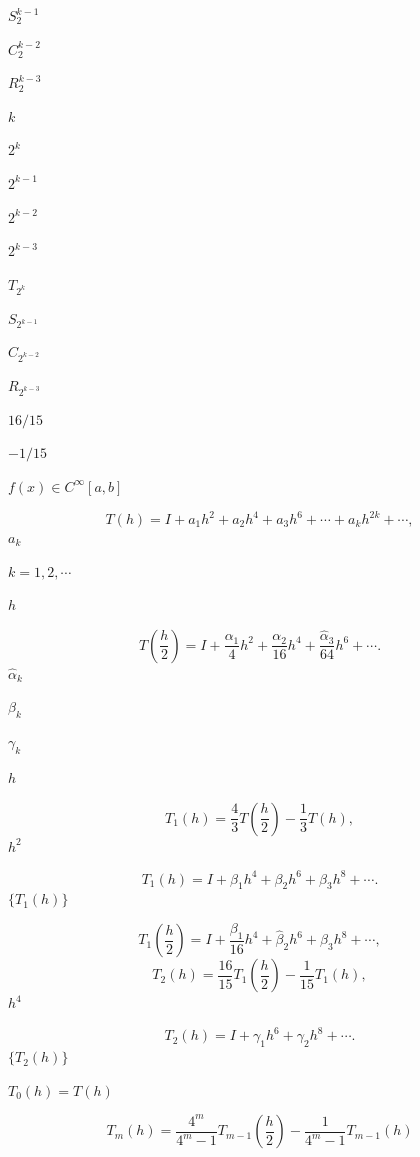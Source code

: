 \documentclass[UTF8,fontset=fandol]{ctexart}
\begin{document}
$S_2^{k-1}$\par
$C_2^{k-2}$\par
$R_2^{k-3}$\par
$k$\par
$2^k$\par
$2^{k-1}$\par
$2^{k-2}$\par
$2^{k-3}$\par
$T_{2^k}$\par
$S_{2^{k-1}}$\par
$C_{2^{k-2}}$\par
$R_{2^{k-3}}$\par
$16/15$\par
$-1/15$\par
$f(x)\in C^\infty[a,b]$\par
\[ 
T(h)=I+a_1h^2+a_2h^4+a_3h^6+\cdots+a_kh^{2k}+\cdots,
\tag{4.3.7}
 \]
$a_k$\par
$k=1,2,\cdots$\par
$h$\par
\[ 
T\left(\frac h2\right)=I+\frac{\alpha_1}{4}h^2+\frac{\alpha_2}{16}h^4+\frac{\hat\alpha_3}{64}h^6+\cdots.
\tag{4.3.8}
 \]
$\hat\alpha_k$\par
$\beta_k$\par
$\gamma_k$\par
$h$\par
\[ 
T_1(h)=\frac43T\left(\frac h2\right)-\frac13T(h),
\tag{4.3.9}
 \]
$h^2$\par
\[ 
T_1(h)=I+\beta_1h^4+\beta_2h^6+\beta_3h^8+\cdots.
\tag{4.3.10}
 \]
$\{T_1(h)\}$\par
\[ 
T_1\left(\frac h2\right)=I+\frac{\beta_1}{16}h^4+\hat\beta_2h^6+\beta_3h^8+\cdots,
 \]
\[ 
T_2(h)=\frac{16}{15}T_1\left(\frac h2\right)-\frac1{15}T_1(h),
 \]
$h^4$\par
\[ 
T_2(h)=I+\gamma_1h^6+\gamma_2h^8+\cdots.
 \]
$\{T_2(h)\}$\par
$T_0(h)=T(h)$\par
\[ 
T_m(h)=\frac{4^m}{4^m-1}T_{m-1}\left(\frac h2\right)-\frac1{4^m-1}T_{m-1}(h)
\tag{4.3.11}
 \]
\end{document}
